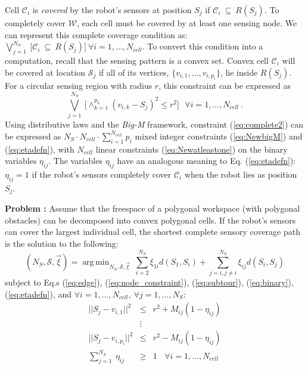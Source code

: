 \documentclass[letterpaper, 10 pt, conference]{ieeeconf}
\theoremstyle{definition}
\newcommand{\Cs}{\mathcal{C}}
\newcommand{\Ss}{\mathcal{S}}
\DeclareMathOperator*{\argmin}{arg\,min}
\newcommand{\cell}{\mathcal{C}}
\begin{document}
Cell $\mathcal{C}_i$ is {\em covered} by the robot's sensors at position $S_j$ if $\mathcal{C}_i\ \subseteq\ R(S_j)$.  To completely cover $\mathcal{W}$,  each cell must be covered by at least one sensing node.  We can represent this complete coverage condition as: $ \bigvee_{j=1}^{N_S}\ \big[\cell_i \ \subseteq\ R(S_j)\big] \ \forall i=1,\ldots,N_{cell}$.  To convert this condition into a computation, recall that the sensing pattern is a convex set.  Convex cell $\Cs_i$ will be covered at location $\Ss_j$ if all of its vertices, $\{v_{i,1},\ldots,v_{i,p_i}\}$, lie inside $R(S_j)$. For a circular sensing region with radius $r$, this constraint can be expressed as 
   \begin{equation}\label{eq:complete2}
    \bigvee_{j=1}^{N_S}\ \big[\wedge_{k=1}^{p_k} (v_{i,k}-S_j)^2\le r^2\big]\ \ \  \forall i=1,\ldots,N_{cell}\ .
  \end{equation}
Using distributive laws and the {\em Big-M} framework, constraint (\ref{eq:complete2}) can be expressed as $N_S \cdot N_{cell} \cdot \sum_{i=1}^{N_{cell}} p_i$ mixed integer constraints (\ref{eq:NewbigM}) and (\ref{eq:etadefn}), with $N_{cell}$ linear constraints (\ref{eq:Newatleastone}) on the binary variables $\eta_{ij}$.  The variables $\eta_{ij}$ have an analogous meaning to Eq. (\ref{eq:etadefn}): $\eta_{ij}=1$ if the robot's sensors completely cover $\cell_i$ when the robot lies as position $S_j$.

{\bf Problem :} Assume that the freespace of a polygonal workspace (with polygonal obstacles) can be decomposed into convex polygonal cells. If the robot's sensors can cover the largest individual cell, the shortest complete sensory coverage path is the solution to the following:
  \begin{equation}\label{eq:OptProblemFull}
    (N_S,\mathcal{S},\vec{\xi}) =  \argmin_{N_S,\mathcal{S},\vec{\xi}} \
            \sum_{i=2}^{N_S} \xi_{1i}d(S_1,S_i)
             + \sum_{j=i,j\ne i}^{N_S} \xi_{ij} d(S_i,S_j)
  \end{equation}
subject to Eq.s (\ref{eq:edge}), (\ref{eq:node_constraint}), (\ref{eq:subtour}), (\ref{eq:binary}), (\ref{eq:etadefn}), and $\forall i=1,\ldots,N_{cell}, \  \forall j=1,\ldots,N_S$:
\begin{eqnarray}
    ||S_j - v_{i,1}||^2  & \le & r^2 + M_{ij}(1-\eta_{ij}) \nonumber \\
                       & \vdots &  \label{eq:NewbigM}\\
    ||S_j - v_{i,p_i}||^2 & \le & r^2 - M_{ij}(1-\eta_{ij}) \nonumber\\
\sum_{j=1}^{N_S}\ \eta_{ij} & \ge & 1 \ \ \ \ \forall i=1,\ldots, N_{cell}  \label{eq:Newatleastone} 
\end{eqnarray}
\end{document}
